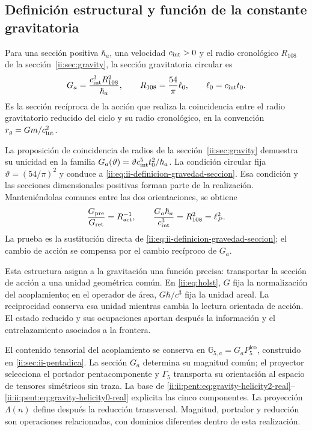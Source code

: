 \subsection{Definición estructural y función de la constante gravitatoria}
\label{ii:sec:ii-definicion-gravedad}

\begin{definition}
Para una sección positiva \(\hbar_a\), una velocidad
\(c_{\rm int}>0\) y el radio cronológico \(R_{108}\) de la
sección~\ref{ii:sec:gravity}, la sección gravitatoria circular es
\begin{equation}
 G_a=\frac{c_{\rm int}^{3}R_{108}^{2}}{\hbar_a},
 \qquad R_{108}=\frac{54}{\pi}\ell_0,
 \qquad \ell_0=c_{\rm int}t_0.
 \label{ii:eq:ii-definicion-gravedad-seccion}
\end{equation}
Es la sección recíproca de la acción que realiza la coincidencia
entre el radio gravitatorio reducido del ciclo y su radio
cronológico, en la convención \(r_g=Gm/c_{\rm int}^2\).
\end{definition}

La proposición de coincidencia de radios de la
sección~\ref{ii:sec:gravity} demuestra su unicidad en la familia
\(G_a(\vartheta)=\vartheta c_{\rm int}^{5}t_0^2/\hbar_a\).
La condición circular fija \(\vartheta=(54/\pi)^2\) y conduce
a \eqref{ii:eq:ii-definicion-gravedad-seccion}. Esa condición y las
secciones dimensionales positivas forman parte de la realización.
Manteniéndolas comunes entre las dos orientaciones, se obtiene
\begin{equation}
 \frac{G_{\mathrm{pre}}}{G_{\mathrm{ret}}}
 =R_{\mathrm{act}}^{-1},
 \qquad
 \frac{G_a\hbar_a}{c_{\rm int}^{3}}
 =R_{108}^{2}=\ell_P^2.
 \label{ii:eq:ii-definicion-gravedad-area}
\end{equation}
La prueba es la sustitución directa de
\eqref{ii:eq:ii-definicion-gravedad-seccion}; el cambio de acción
se compensa por el cambio recíproco de \(G_a\).

Esta estructura asigna a la gravitación una función precisa:
transportar la sección de acción a una unidad geométrica común.
En \eqref{ii:eq:holst}, \(G\) fija la normalización del acoplamiento;
en el operador de área, \(G\hbar/c^3\) fija la unidad areal.
La reciprocidad conserva esa unidad mientras cambia la lectura
orientada de acción. El estado reducido y sus ocupaciones aportan
después la información y el entrelazamiento asociados a la frontera.

El contenido tensorial del acoplamiento se conserva en
\(\mathbb G_{5,a}=G_aP^{\mathrm{ico}}_5\), construido en
\ref{ii:sec:ii-pentadica}. La sección \(G_a\) determina su magnitud común;
el proyector selecciona el portador pentacomponente y \(\Gamma_5\)
transporta su orientación al espacio de tensores simétricos sin traza.
La base de \eqref{ii:ii:pent:eq:gravity-helicity2-real}--\eqref{ii:ii:pent:eq:gravity-helicity0-real}
explicita las cinco componentes. La proyección \(\Lambda(n)\) define
después la reducción transversal. Magnitud, portador y reducción son
operaciones relacionadas, con dominios diferentes dentro de esta realización.
